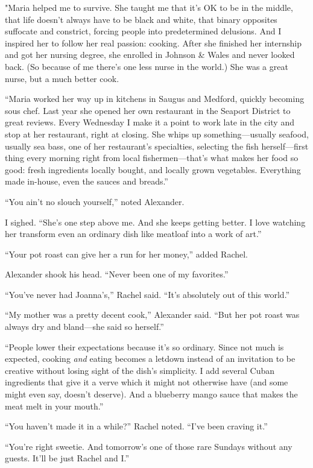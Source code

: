 "Maria helped me to survive. She taught me that it's OK to be in the
middle, that life doesn't always have to be black and white, that binary
opposites suffocate and constrict, forcing people into predetermined
delusions. And I inspired her to follow her real passion: cooking. After
she finished her internship and got her nursing degree, she enrolled in
Johnson \& Wales and never looked back. (So because of me there's one
less nurse in the world.) She was a great nurse, but a much better cook.

``Maria worked her way up in kitchens in Saugus and Medford, quickly
becoming sous chef. Last year she opened her own restaurant in the
Seaport District to great reviews. Every Wednesday I make it a point to
work late in the city and stop at her restaurant, right at closing. She
whips up something---usually seafood, usually sea bass, one of her
restaurant's specialties, selecting the fish herself---first thing every
morning right from local fishermen---that's what makes her food so good:
fresh ingredients locally bought, and locally grown vegetables.
Everything made in-house, even the sauces and breads.''

``You ain't no slouch yourself,'' noted Alexander.

I sighed. ``She's one step above me. And she keeps getting better. I
love watching her transform even an ordinary dish like meatloaf into a
work of art.''

``Your pot roast can give her a run for her money,'' added Rachel.

Alexander shook his head. ``Never been one of my favorites.''

``You've never had Joanna's,'' Rachel said. ``It's absolutely out of
this world.''

``My mother was a pretty decent cook,'' Alexander said. ``But her pot
roast was always dry and bland---she said so herself.''

``People lower their expectations because it's so ordinary. Since not
much is expected, cooking \emph{and} eating becomes a letdown instead of
an invitation to be creative without losing sight of the dish's
simplicity. I add several Cuban ingredients that give it a verve which
it might not otherwise have (and some might even say, doesn't deserve).
And a blueberry mango sauce that makes the meat melt in your mouth.''

``You haven't made it in a while?'' Rachel noted. ``I've been craving
it.''

``You're right sweetie. And tomorrow's one of those rare Sundays without
any guests. It'll be just Rachel and I.''

